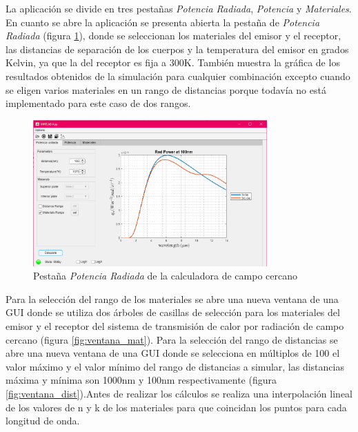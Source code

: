 La aplicación se divide en tres pestañas \textit{Potencia Radiada}, \textit{Potencia} y \textit{Materiales}. En cuanto se abre la aplicación se presenta abierta la pestaña de \textit{Potencia Radiada} (figura \ref{fig:pestana_PotenciaRadiada}), donde se seleccionan los materiales del emisor y el receptor, las distancias de separación de los cuerpos y la temperatura del emisor en grados Kelvin, ya que la del receptor es fija a 300K. También muestra la gráfica de los resultados obtenidos de la simulación para cualquier combinación excepto cuando se eligen varios materiales en un rango de distancias porque todavía no está implementado para este caso de dos rangos.\\ 
\begin{figure}[H]
	\centering
		\includegraphics[width=0.80\textwidth]{figuras/pestana_PotenciaRadiada2.png}
	\caption{Pestaña \textit{Potencia Radiada} de la calculadora de campo cercano}
	\label{fig:pestana_PotenciaRadiada}
\end{figure}
Para la selección del rango de los materiales se abre una nueva ventana de una GUI donde se utiliza dos árboles de casillas de selección para los materiales del emisor y el receptor del sistema de transmisión de calor por radiación de campo cercano (figura \ref{fig:ventana_mat}). Para la selección del rango de distancias se abre una nueva ventana de una GUI donde se selecciona en múltiplos de 100 el valor máximo y el valor mínimo del rango de distancias a simular, las distancias máxima y mínima son 1000nm y 100nm respectivamente (figura \ref{fig:ventana_dist}).Antes de realizar los cálculos se realiza una interpolación lineal de los valores de n y k de los materiales para que coincidan los puntos para cada longitud de onda.\\\\
